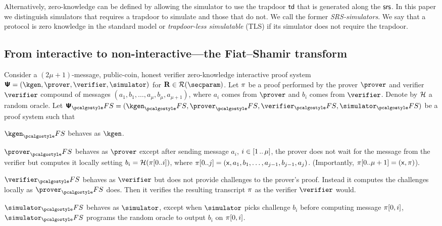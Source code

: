 Alternatively, zero-knowledge can be defined by allowing the simulator to use
the trapdoor $\mathsf{td}$ that is generated along the $\mathsf{srs}$. In this paper we distinguish
simulators that requires a trapdoor to simulate and those that do not. We call
the former \emph{SRS-simulators}. We say that a protocol is zero knowledge in
the standard model or  \emph{trapdoor-less simulatable} (TLS) if its simulator does not require the trapdoor.


\subsection{From interactive to non-interactive---the Fiat--Shamir transform}
Consider a $(2\mu + 1)$-message, public-coin, honest verifier zero-knowledge
interactive proof system
$\proofsystem = (\kgen, \prover, \verifier, \simulator)$ for
$\REL \in \RELGEN(\secparam)$.  Let $\pi$ be a proof performed by the
prover $\prover$ and verifier $\verifier$ compound of messages
$(a_1, b_1, \ldots, a_{\mu}, b_{\mu}, a_{\mu + 1})$, where $a_i$ comes from
$\prover$ and $b_i$ comes from $\verifier$.  Denote by $\mathcal{H}$ a random oracle.
Let $\proofsystem_\fs = (\kgen_\fs, \prover_\fs, \verifier_\fs, \simulator_\fs)$
be a proof system such that
\begin{compactitem}
  \item $\kgen_\fs$ behaves as $\kgen$.
  \item $\prover_\fs$ behaves as $\prover$ except after sending message
    $a_i$, $i \in [1 \, .. \, \mu]$, the prover does not wait for
    the message from the verifier but computes it locally setting $b_i
    = \mathcal{H}(\pi[0..i])$, where $\pi[0..j] = (\mathsf{x}, a_1, b_1, \ldots,
    a_{j - 1}, b_{j - 1}, a_j)$. (Importantly, $\pi[0..\mu + 1] =
    (\mathsf{x}, \pi)$).
  \item $\verifier_\fs$ behaves as $\verifier$ but does not provide
    challenges to the prover's proof. Instead it computes the
    challenges locally as $\prover_\fs$ does. Then it verifies the
    resulting transcript $\pi$ as the verifier $\verifier$ would. 
  \item $\simulator_\fs$ behaves as $\simulator$, except when
    $\simulator$ picks challenge $b_i$ before computing message $\pi[0, i]$, $\simulator_\fs$ programs the
    random oracle to output $b_i$ on $\pi[0, i]$.
  \end{compactitem}

